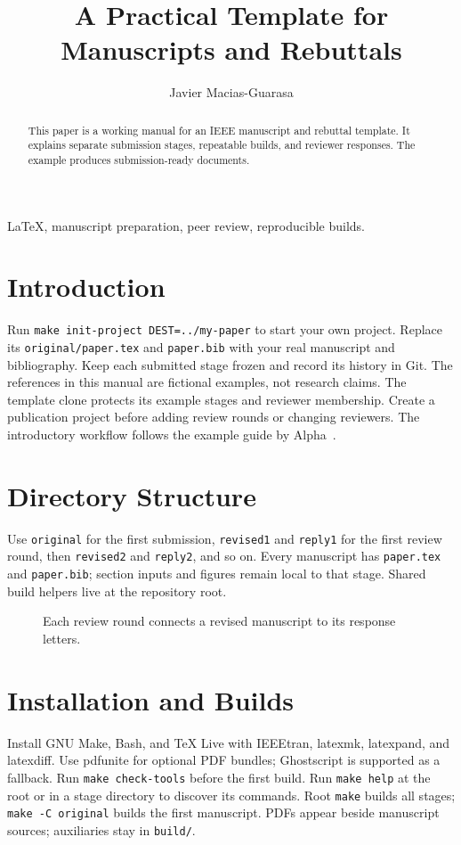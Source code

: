 \documentclass[journal]{IEEEtran}
\title{A Practical Template for Manuscripts and Rebuttals}
\author{Javier Macias-Guarasa}
\begin{document}
\maketitle
\begin{abstract}
This paper is a working manual for an IEEE manuscript and rebuttal template.
It explains separate submission stages, repeatable builds, and reviewer responses.
The example produces submission-ready documents.
\end{abstract}
\begin{IEEEkeywords}
LaTeX, manuscript preparation, peer review, reproducible builds.
\end{IEEEkeywords}
\section{Introduction}
Run \texttt{make init-project DEST=../my-paper} to start your own project.
Replace its \texttt{original/paper.tex} and \texttt{paper.bib} with your real manuscript
and bibliography. Keep each submitted stage frozen and record its history in Git.
The references in this manual are fictional examples, not research claims.
The template clone protects its example stages and reviewer membership.
Create a publication project before adding review rounds or changing reviewers.
The introductory workflow follows the example guide by Alpha~\cite{guide}.
\section{Directory Structure}
Use \texttt{original} for the first submission, \texttt{revised1} and \texttt{reply1}
for the first review round, then \texttt{revised2} and \texttt{reply2}, and so on.
Every manuscript has \texttt{paper.tex} and \texttt{paper.bib}; section inputs and figures
remain local to that stage. Shared build helpers live at the repository root.
\begin{figure}[!b]
\centering

\caption{Each review round connects a revised manuscript to its response letters.}
\label{fig:workflow}
\end{figure}
\section{Installation and Builds}
Install GNU Make, Bash, and TeX Live with IEEEtran, latexmk, latexpand, and latexdiff.
Use pdfunite for optional PDF bundles; Ghostscript is supported as a fallback.
Run \texttt{make check-tools} before the first build.
Run \texttt{make help} at the root or in a stage directory to discover its commands.
Root \texttt{make} builds all stages; \texttt{make -C original} builds the first manuscript.
PDFs appear beside manuscript sources; auxiliaries stay in \texttt{build/}.

\end{document}
